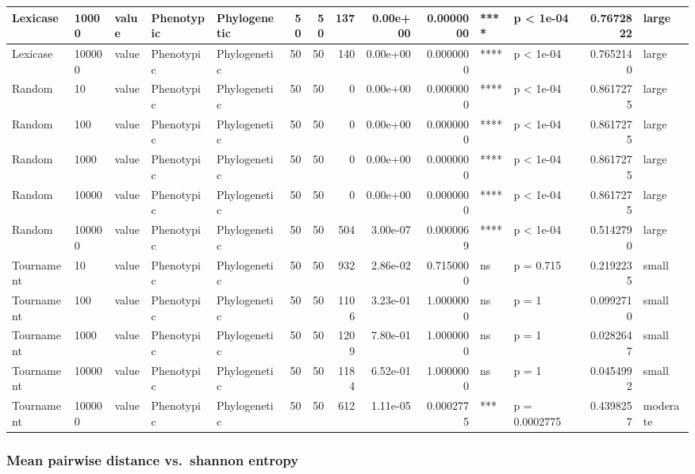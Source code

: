 \documentclass[]{book}
\begin{document}
\begin{table}
\begin{tabular}[t]{l|l|l|l|l|r|r|r|r|r|l|l|r|l}
\hline
Lexicase & 10000 & value & Phenotypic & Phylogenetic & 50 & 50 & 137 & 0.00e+00 & 0.0000000 & **** & p < 1e-04 & 0.7672822 & large\\
\hline
Lexicase & 100000 & value & Phenotypic & Phylogenetic & 50 & 50 & 140 & 0.00e+00 & 0.0000000 & **** & p < 1e-04 & 0.7652140 & large\\
\hline
Random & 10 & value & Phenotypic & Phylogenetic & 50 & 50 & 0 & 0.00e+00 & 0.0000000 & **** & p < 1e-04 & 0.8617275 & large\\
\hline
Random & 100 & value & Phenotypic & Phylogenetic & 50 & 50 & 0 & 0.00e+00 & 0.0000000 & **** & p < 1e-04 & 0.8617275 & large\\
\hline
Random & 1000 & value & Phenotypic & Phylogenetic & 50 & 50 & 0 & 0.00e+00 & 0.0000000 & **** & p < 1e-04 & 0.8617275 & large\\
\hline
Random & 10000 & value & Phenotypic & Phylogenetic & 50 & 50 & 0 & 0.00e+00 & 0.0000000 & **** & p < 1e-04 & 0.8617275 & large\\
\hline
Random & 100000 & value & Phenotypic & Phylogenetic & 50 & 50 & 504 & 3.00e-07 & 0.0000069 & **** & p < 1e-04 & 0.5142790 & large\\
\hline
Tournament & 10 & value & Phenotypic & Phylogenetic & 50 & 50 & 932 & 2.86e-02 & 0.7150000 & ns & p = 0.715 & 0.2192235 & small\\
\hline
Tournament & 100 & value & Phenotypic & Phylogenetic & 50 & 50 & 1106 & 3.23e-01 & 1.0000000 & ns & p = 1 & 0.0992710 & small\\
\hline
Tournament & 1000 & value & Phenotypic & Phylogenetic & 50 & 50 & 1209 & 7.80e-01 & 1.0000000 & ns & p = 1 & 0.0282647 & small\\
\hline
Tournament & 10000 & value & Phenotypic & Phylogenetic & 50 & 50 & 1184 & 6.52e-01 & 1.0000000 & ns & p = 1 & 0.0454992 & small\\
\hline
Tournament & 100000 & value & Phenotypic & Phylogenetic & 50 & 50 & 612 & 1.11e-05 & 0.0002775 & *** & p = 0.0002775 & 0.4398257 & moderate\\
\hline
\end{tabular}
\end{table}

\hypertarget{mean-pairwise-distance-vs.shannon-entropy}{%
\subsubsection{Mean pairwise distance vs.~shannon entropy}\label{mean-pairwise-distance-vs.shannon-entropy}}
\end{document}
